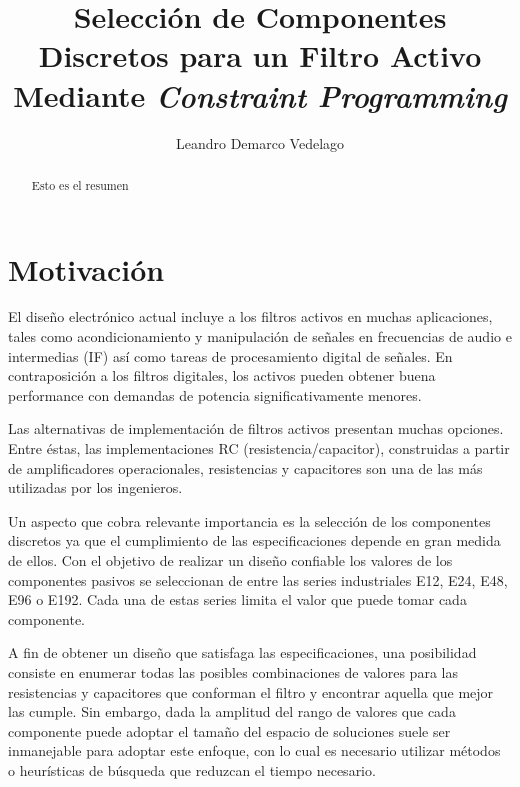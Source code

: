 \documentclass{llncs}
\title{Selecci\'on de Componentes Discretos para un Filtro Activo Mediante
  \textit{Constraint Programming}}
\author{Leandro Demarco Vedelago}
\institute{
            \email{leandrodemarco@gmail.com}\\
            Universidad Nacional de C\'ordoba, Fa.M.A.F
          }
\begin{document}
{\def\addcontentsline#1#2#3{}\maketitle
  \noindent
  }
  
\begin{abstract}
  Esto es el resumen 
\end{abstract}

\tableofcontents
\newpage
  \section{\textbf{Motivaci\'on}}
    \label{sec:motivacion}
    El dise\~no electr\'onico actual incluye a los filtros activos en muchas aplicaciones,
    tales como acondicionamiento y manipulaci\'on de se\~nales en frecuencias de audio e
    intermedias (IF) as\'i como tareas de procesamiento digital de se\~nales. En
    contraposici\'on a los filtros digitales, los activos pueden obtener buena performance
    con demandas de potencia significativamente menores.
    
    Las alternativas de implementaci\'on de filtros activos presentan muchas opciones.
    Entre \'estas, las implementaciones RC (resistencia/capacitor), construidas a partir de
    amplificadores operacionales, resistencias y capacitores son una de las m\'as utilizadas
    por los ingenieros.\cite{corr}
    
    Un aspecto que cobra relevante importancia es la selección de los componentes discretos
    ya que el cumplimiento de las especificaciones depende en gran medida de ellos. Con el
    objetivo de realizar un diseño confiable los valores de los componentes pasivos se
    seleccionan de entre las series industriales E12, E24, E48, E96 o E192. Cada una de estas
    series limita el valor que puede tomar cada componente.
    
    A fin de obtener un diseño que satisfaga las especificaciones,  una posibilidad consiste 
    en enumerar todas las posibles combinaciones de valores para las resistencias y 
    capacitores que conforman el filtro y encontrar aquella que mejor las cumple. Sin embargo,
    dada la amplitud del rango de valores que cada componente puede adoptar el tamaño del
    espacio de soluciones suele ser inmanejable para adoptar este enfoque, con
    lo cual es necesario utilizar métodos o heurísticas de búsqueda que reduzcan el tiempo
    necesario.
    
\end{document}
